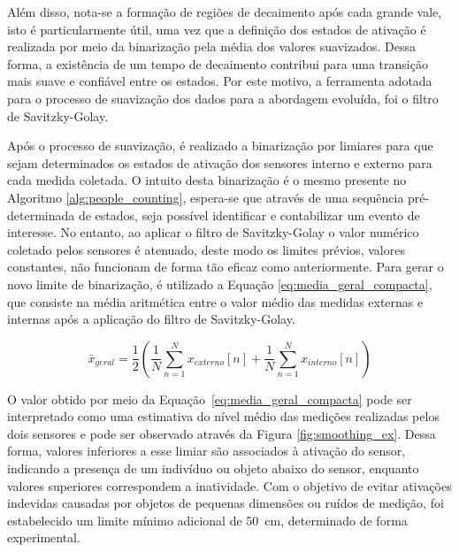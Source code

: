 Além disso, nota-se a formação de regiões de decaimento após cada grande vale, isto é particularmente útil, uma vez que a definição dos estados de ativação é realizada por meio da binarização pela média dos valores suavizados. Dessa forma, a existência de um tempo de decaimento contribui para uma transição mais suave e confiável entre os estados. Por este motivo, a ferramenta adotada para o processo de suavização dos dados para a abordagem evoluída, foi o filtro de Savitzky-Golay.

Após o processo de suavização, é realizado a binarização por limiares para que sejam determinados os estados de ativação dos sensores interno e externo para cada medida coletada. O intuito desta binarização é o mesmo presente no Algoritmo \ref{alg:people_counting}, espera-se que através de uma sequência pré-determinada de estados, seja possível identificar e contabilizar um evento de interesse. No entanto, ao aplicar o filtro de Savitzky-Golay o valor numérico coletado pelos sensores é atenuado, deste modo os limites prévios, valores constantes, não funcionam de forma tão eficaz como anteriormente. Para gerar o novo limite de binarização, é utilizado a Equação \ref{eq:media_geral_compacta}, que consiste na média aritmética entre o valor médio das medidas externas e internas após a aplicação do filtro de Savitzky-Golay. 

\begin{equation}
\bar{x}_{geral}
= \frac{1}{2}
\left(
	\frac{1}{N} \sum_{n=1}^{N} x_{externo}[n]
+
	\frac{1}{N} \sum_{n=1}^{N} x_{interno}[n]
\right)
\label{eq:media_geral_compacta}
\end{equation}

O valor obtido por meio da Equação~\ref{eq:media_geral_compacta} pode ser interpretado como uma estimativa do nível médio das medições realizadas pelos dois sensores e pode ser observado através da Figura \ref{fig:smoothing_ex}. Dessa forma, valores inferiores a esse limiar são associados à ativação do sensor, indicando a presença de um indivíduo ou objeto abaixo do sensor, enquanto valores superiores correspondem a inatividade. Com o objetivo de evitar ativações indevidas causadas por objetos de pequenas dimensões ou ruídos de medição, foi estabelecido um limite mínimo adicional de 50~cm, determinado de forma experimental.

